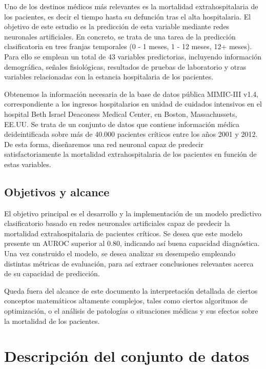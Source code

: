 \documentclass{report}
\begin{document}
Uno de los destinos médicos más relevantes es la mortalidad extrahospitalaria de los pacientes, es decir el tiempo hasta su defunción tras el alta hospitalaria. El objetivo de este estudio es la predicción de esta variable mediante redes neuronales artificiales. En concreto, se trata de una tarea de la predicción clasificatoria en tres franjas temporales (0 - 1 meses, 1 - 12 meses, 12+ meses). Para ello se emplean un total de 43 variables predictorias, incluyendo información demográfica, señales fisiológicas, resultados de pruebas de laboratorio y otras variables relacionadas con la estancia hospitalaria de los pacientes.

Obtenemos la información necesaria de la base de datos pública MIMIC-III v1.4, correspondiente a los ingresos hospitalarios en unidad de cuidados intensivos en el hospital Beth Israel Deaconess Medical Center, en Boston, Massachussets, EE.UU. Se trata de un conjunto de datos que contiene información médica deideintificada sobre más de 40.000 pacientes críticos entre los años 2001 y 2012. De esta forma, diseñaremos una red neuronal capaz de predecir satisfactoriamente la mortalidad extrahospitalaria de los pacientes en función de estas variables.


\section{Objetivos y alcance}

El objetivo principal es el desarrollo y la implementación de un modelo predictivo clasificatorio basado en redes neuronales artificiales capaz de predecir la mortalidad extrahospitalaria de pacientes críticos. Se desea que este modelo presente un AUROC superior al 0.80, indicando así buena capacidad diagnóstica. Una vez construido el modelo, se desea analizar su desempeño empleando distintas métricas de evaluación, para así extraer conclusiones relevantes acerca de su capacidad de predicción.

Queda fuera del alcance de este documento la interpretación detallada de ciertos conceptos matemáticos altamente complejos, tales como ciertos algoritmos de optimización, o el análisis de patologías o situaciones médicas y sus efectos sobre la mortalidad de los pacientes. 

\chapter{Descripción del conjunto de datos}
\end{document}
